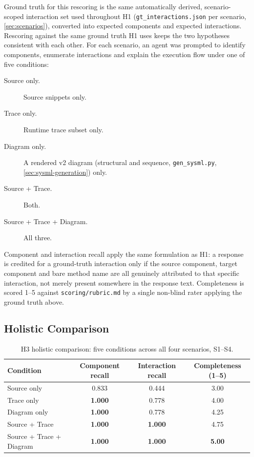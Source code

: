 Ground truth for this rescoring is the same automatically derived,
scenario-scoped interaction set used throughout H1
(\texttt{gt\_interactions.json} per scenario, \cref{sec:scenarios}),
converted into expected components and expected interactions. Rescoring against the same ground
truth H1 uses keeps the two hypotheses consistent with each other. For
each scenario, an agent was prompted to identify components, enumerate
interactions and explain the execution flow under one of five
conditions:

\begin{description}
  \item[Source only.] Source snippets only.
  \item[Trace only.] Runtime trace subset only.
  \item[Diagram only.] A rendered \sysml v2 diagram (structural and
    sequence, \texttt{gen\_sysml.py}, \cref{sec:sysml-generation}) only.
  \item[Source + Trace.] Both.
  \item[Source + Trace + Diagram.] All three.
\end{description}

Component and interaction recall apply the same formulation as H1: a
response is credited for a ground-truth interaction only if the source
component, target component and bare method name are all genuinely
attributed to that specific interaction, not merely present somewhere
in the response text. Completeness is scored 1--5 against
\texttt{scoring/rubric.md} by a single non-blind rater applying the
ground truth above.

\subsection{Holistic Comparison}
\label{sec:h3-holistic}

\begin{table}[htb]
\centering
\caption{H3 holistic comparison: five conditions across all four scenarios, S1--S4.}
\label{tab:h3-holistic}
\small
\begin{tabular}{@{} l c c c @{}}
\toprule
\textbf{Condition} & \textbf{Component recall} & \textbf{Interaction recall} & \textbf{Completeness (1--5)} \\
\midrule
Source only               & 0.833 & 0.444 & 3.00 \\
Trace only                 & \textbf{1.000} & 0.778 & 4.00 \\
Diagram only               & \textbf{1.000} & 0.778 & 4.25 \\
Source + Trace              & \textbf{1.000} & \textbf{1.000} & 4.75 \\
Source + Trace + Diagram    & \textbf{1.000} & \textbf{1.000} & \textbf{5.00} \\
\bottomrule
\end{tabular}
\end{table}


